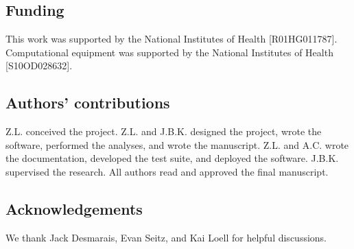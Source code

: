\documentclass[pdflatex,sn-vancouver-num,referee,lineno,oneside]{sn-jnl}
\begin{document}
\subsection*{Funding}
This work was supported by the National Institutes of Health [R01HG011787]. Computational equipment was supported by the National Institutes of Health [S10OD028632].

\subsection*{Authors' contributions}
Z.L. conceived the project. Z.L. and J.B.K. designed the project, wrote the software, performed the analyses, and wrote the manuscript. Z.L. and A.C. wrote the documentation, developed the test suite, and deployed the software. J.B.K. supervised the research. All authors read and approved the final manuscript.

\subsection*{Acknowledgements}
We thank Jack Desmarais, Evan Seitz, and Kai Loell for helpful discussions.


\end{document}
